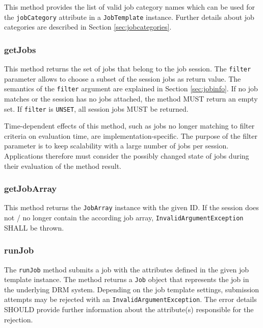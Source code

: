 \documentclass{article}
\newcommand{\h}[1]{\lstinline|#1|}
\newcommand{\rat}[1]{}
\begin{document}
This method provides the list of valid job category names which can be used for the \h{jobCategory} attribute in a \h{JobTemplate} instance. Further details about job categories are described in Section \ref{sec:jobcategories}.

\subsubsection{getJobs}

This method returns the set of jobs that belong to the job session. The \h{filter} parameter allows to choose a subset of the session jobs as return value. The semantics of the \h{filter} argument are explained in Section \ref{sec:jobinfo}. If no job matches or the session has no jobs attached, the method MUST return an empty set. If \h{filter} is \h{UNSET}, all session jobs MUST be returned.

Time-dependent effects of this method, such as jobs no longer matching to filter criteria on evaluation time, are implementation-specific. The purpose of the filter parameter is to keep scalability with a large number of jobs per session. Applications therefore must consider the possibly changed state of jobs during their evaluation of the method result.

\rat{We are aware of the fact that the reaping of terminated jobs in some DRM systems might change this methods result. However, there was no way to demand some standardized behavior for that.}

\subsubsection{getJobArray}

This method returns the \h{JobArray} instance with the given ID. If the session does not / no longer contain the according job array, \h{InvalidArgumentException} SHALL be thrown.

\rat {
June 2011 conf. call decided to not support JobArray filtering in the session at this point. The face-to-face meeting in June 2011 identified that DRM systems typically do not support the identification of bulk jobs in the system, so it would be hard to implement the according reporting function.
}

\subsubsection{runJob}

The \h{runJob} method submits a job with the attributes defined in the given job template instance. The method returns a \h{Job} object that represents the job in the underlying DRM system. Depending on the job template settings, submission attempts may be rejected with an \h{InvalidArgumentException}. The error details SHOULD provide further information about the attribute(s) responsible for the rejection.
\end{document}

